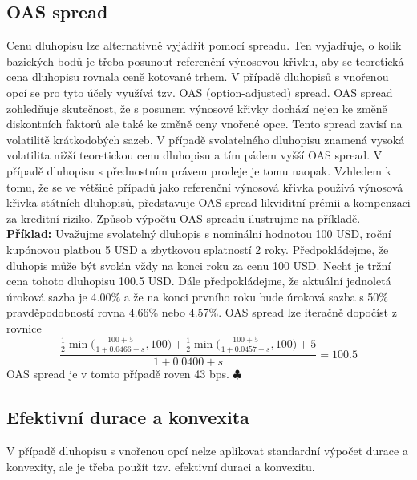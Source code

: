 \documentclass[a4paper]{book}
\begin{document}
\subsection{OAS spread}

Cenu dluhopisu lze alternativně vyjádřit pomocí spreadu. Ten vyjadřuje, o kolik bazických bodů je třeba posunout referenční výnosovou křivku, aby se teoretická cena dluhopisu rovnala ceně kotované trhem. V případě dluhopisů s vnořenou opcí se pro tyto účely využívá tzv. OAS (option-adjusted) spread. OAS spread zohledňuje skutečnost, že s posunem výnosové křivky dochází nejen ke změně diskontních faktorů ale také ke změně ceny vnořené opce. Tento spread zavisí na volatilitě krátkodobých sazeb. V případě svolatelného dluhopisu znamená vysoká volatilita nižší teoretickou cenu dluhopisu a tím pádem vyšší OAS spread. V případě dluhopisu s přednostním právem prodeje je tomu naopak. Vzhledem k tomu, že se ve většině případů jako referenční výnosová křivka používá výnosová křivka státních dluhopisů, představuje OAS spread likviditní prémii a kompenzaci za kreditní riziko. Způsob výpočtu OAS spreadu ilustrujme na příkladě.\\

\noindent \textbf{Příklad:} Uvažujme svolatelný dluhopis s nominální hodnotou 100 USD, roční kupónovou platbou 5 USD a zbytkovou splatností 2 roky. Předpokládejme, že dluhopis může být svolán vždy na konci roku za cenu 100 USD. Nechť je tržní cena tohoto dluhopisu 100.5 USD. Dále předpokládejme, že aktuální jednoletá úroková sazba je 4.00\% a že na konci prvního roku bude úroková sazba s 50\% pravděpodobností rovna 4.66\% nebo 4.57\%. OAS spread lze iteračně dopočíst z rovnice
\begin{equation*}
\frac{\frac{1}{2}\min \Big(\frac{100 + 5}{1 + 0.0466 + s},100\Big) + \frac{1}{2}\min \Big(\frac{100 + 5}{1 + 0.0457 + s},100\Big) + 5}{1 + 0.0400 + s} = 100.5
\end{equation*}
OAS spread je v tomto případě roven 43 bps. $\clubsuit$

\subsection{Efektivní durace a konvexita}

V případě dluhopisu s vnořenou opcí nelze aplikovat standardní výpočet durace a konvexity, ale je třeba použít tzv. efektivní duraci a konvexitu.
\end{document}
